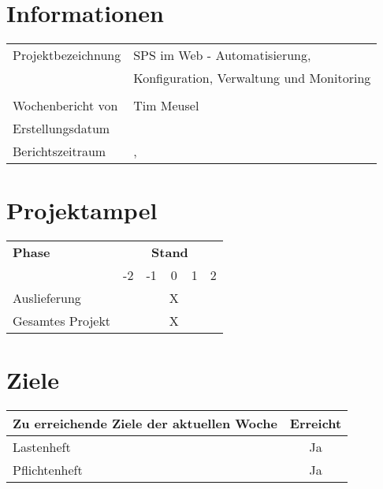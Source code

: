 
\section*{Informationen}

\begin{tabularx}{\textwidth}{lX}
\arrayrulecolor{OliveGreen}
\toprule[2pt]
Projektbezeichnung	         	& SPS im Web - Automatisierung,            	\\
								& Konfiguration, Verwaltung und Monitoring 	\\
         						& 								\\ \midrule
Wochenbericht von				& Tim Meusel                     			\\ \midrule
Erstellungsdatum				& \datum                             		\\ \midrule
Berichtszeitraum				& \berichtsdatum,~\KW							\\
\bottomrule[2pt]
\end{tabularx}

\section*{Projektampel}

\begin{tabularx}{\textwidth}{Xccccc}
\arrayrulecolor{OliveGreen}
\toprule
{\bf Phase} 			& \multicolumn{5}{c}{\bf Stand} 			\\ 
\cmidrule(l){2-6}
						&	-2	& -1	& 0 	& 1		& 2		\\
\midrule[2pt]
Auslieferung         	        & \cellcolor{red}	& \cellcolor{red!40} 	& \cellcolor{green!10}	X	& \cellcolor{green!40}	& \cellcolor{green}      \\ \midrule
Gesamtes Projekt		& \cellcolor{red}	& \cellcolor{red!40} 	& \cellcolor{green!10}	X	& \cellcolor{green!40}	& \cellcolor{green}      \\ 
\bottomrule[2pt]
\end{tabularx}

\section*{Ziele}

\begin{tabularx}{\textwidth}{Xc}
\arrayrulecolor{OliveGreen}
\toprule
{\bf Zu erreichende Ziele der aktuellen Woche} 							& {\bf Erreicht}  	\\ 
\midrule[2pt]
Lastenheft									&Ja		\\
\rowcolor{OliveGreen!15}
Pflichtenheft								&Ja		\\
\bottomrule[2pt]
\end{tabularx}

